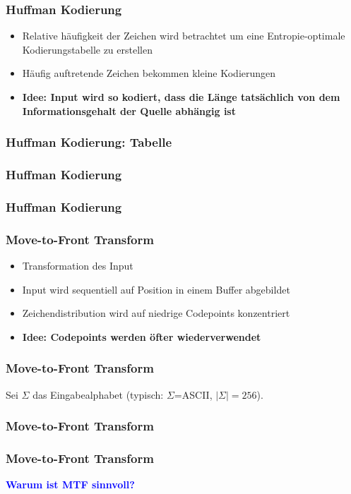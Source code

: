 \documentclass{beamer}
\newcommand{\blue}{\textcolor{blue}}
\begin{document}
\begin{frame}
    \frametitle{Huffman Kodierung}
    \begin{tcolorbox}[standard, title=Überblick]
        \begin{itemize}
            \item Relative häufigkeit der Zeichen wird betrachtet um eine Entropie-optimale Kodierungstabelle zu erstellen
            \item Häufig auftretende Zeichen bekommen kleine Kodierungen
            \item \textbf{Idee: Input wird so kodiert, dass die Länge tatsächlich von dem Informationsgehalt der Quelle abhängig ist}
        \end{itemize}
    \end{tcolorbox}
\end{frame}
\begin{frame}
    \frametitle{Huffman Kodierung: Tabelle}
    
\end{frame}
\begin{frame}
    \frametitle{Huffman Kodierung}
    
\end{frame}
\begin{frame}
    \frametitle{Huffman Kodierung}
    
\end{frame}

\begin{frame}
    \frametitle{Move-to-Front Transform}
    \begin{tcolorbox}[standard, title=Überblick]
        \begin{itemize}
            \item Transformation des Input
            \item Input wird sequentiell auf Position in einem Buffer abgebildet
            \item Zeichendistribution wird auf niedrige Codepoints konzentriert
            \item \textbf{Idee: Codepoints werden öfter wiederverwendet}
        \end{itemize}
    \end{tcolorbox}
\end{frame}
\begin{frame}
    \frametitle{Move-to-Front Transform}
    Sei $\Sigma$ das Eingabealphabet (typisch: $\Sigma$=ASCII, $|\Sigma|=256$).
    
\end{frame}
\begin{frame}
    \frametitle{Move-to-Front Transform}
    
\end{frame}
\begin{frame}
    \frametitle{Move-to-Front Transform}
    \begin{center}
        \Large{\blue{\textbf{Warum ist MTF sinnvoll?}}}
    \end{center}
\end{frame}
\end{document}
